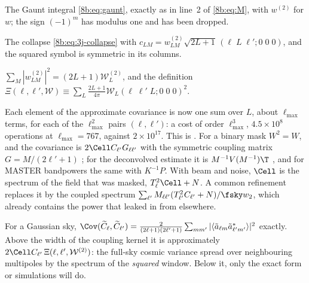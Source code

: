 \begin{explain}
  \item The Gaunt integral \eqref{8b:eq:gaunt}, exactly as in line~2 of \eqref{8b:eq:M}, with $w^{(2)}$ for $w$; the
        sign $(-1)^m$ has modulus one and has been dropped.
  \item The collapse \eqref{8b:eq:3j-collapse} with $c_{LM}=w^{(2)}_{LM}\sqrt{2L+1}\,(\ell\;L\;\ell';0\;0\;0)$, and the squared
        symbol is symmetric in its columns.
  \item $\sum_M|w^{(2)}_{LM}|^2=(2L+1)\mathcal W^{(2)}_L$, and the definition
        $\Xi(\ell,\ell',\mathcal W)\equiv\sum_L\frac{2L+1}{4\pi}\mathcal W_L(\ell\;\ell'\;L;0\;0\;0)^2$.
\end{explain}
Each element of the approximate covariance is now one sum over $L$, about $\ell_{\max}$ terms, for each of the
$\ell_{\max}^2$ pairs $(\ell,\ell')$: a cost of order $\ell_{\max}^3$, $4.5\times10^8$ operations at $\ell_{\max}=767$, against $2\times10^{17}$.
This is \cite[eqs~15a--15b]{Efstathiou2004}. For a binary mask $W^2=W$, and the covariance is
$2\Cell C_{\ell'}G_{\ell\ell'}$ with the symmetric coupling matrix $G=M/(2\ell'+1)$ \cite[eq.~16]{Efstathiou2004};
for the deconvolved estimate it is $M^{-1}V(M^{-1})\T$ \cite[eq.~17]{Efstathiou2004}, and for MASTER
bandpowers the same with $K^{-1}P$. With beam and noise, $\Cell$ is the spectrum of the field that was
masked, $T_\ell^2\Cell+N$. A common refinement replaces it by the coupled spectrum
$\sum_{\ell'}M_{\ell\ell'}(T^2_{\ell'}C_{\ell'}+N)/\fsky w_2$, which already contains the power that leaked in from
elsewhere.

\begin{keyidea}
For a Gaussian sky,
$\Cov(\widetilde C_\ell,\widetilde C_{\ell'})=\frac{2}{(2\ell+1)(2\ell'+1)}\sum_{mm'}|\langle\tilde a_{\ell m}\tilde a^*_{\ell'm'}\rangle|^2$ exactly.
Above the width of the coupling kernel it is approximately $2\Cell C_{\ell'}\,\Xi(\ell,\ell',\mathcal W^{(2)})$: the
full-sky cosmic variance spread over neighbouring multipoles by the spectrum of the \emph{squared}
window. Below it, only the exact form or simulations will do.
\end{keyidea}

